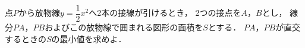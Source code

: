 \documentclass[../../main.tex]{subfiles}
\begin{document}
点$P$から放物線$\displaystyle y=\dfrac{1}{2}x^2$へ2本の接線が引けるとき，
2つの接点を$A$，$B$とし，
線分$PA$，$PB$およびこの放物線で囲まれる図形の面積を$S$とする．
$PA$，$PB$が直交するときの$S$の最小値を求めよ．
\end{document}
